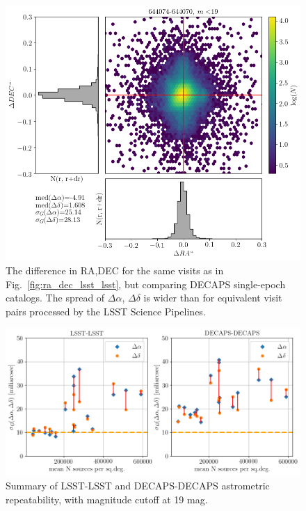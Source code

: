 \documentclass[DM,lsstdraft,toc,usenatbib,authoryear]{lsstdoc}
\begin{document}
\begin{figure}
\begin{centering}
\includegraphics[width=0.8\columnwidth]{figs/decaps644074-644070_RA_DEC_offset_lims.png}
\caption{The difference in RA,DEC for  the same visits as in Fig.~\ref{fig:ra_dec_lsst_lsst}, but comparing DECAPS single-epoch catalogs. The spread of  $\Delta \alpha$, $\Delta \delta$ is wider than for equivalent visit pairs processed by the LSST Science Pipelines. }
\label{fig:ra_dec_decaps_decaps}
\end{centering}
\end{figure}




\begin{figure}
\begin{centering}
\includegraphics[width=0.8\columnwidth]{figs/Astrometry_LSST-LSST_DECAPS-DECAPS.png}
\caption{Summary of LSST-LSST and DECAPS-DECAPS astrometric repeatability, with magnitude cutoff at 19 mag.}
\label{fig:ra_dec_summary}
\end{centering}
\end{figure}
\end{document}
